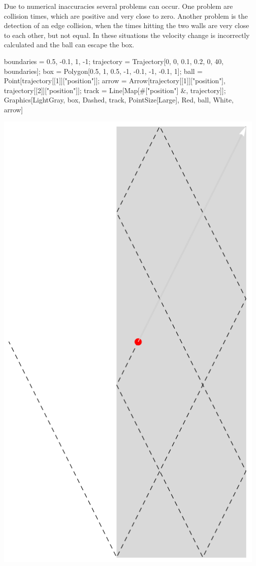 \documentclass{tstextbook}
\begin{document}
\begin{example}
Due to numerical inaccuracies several problems can occur. One problem are collision times, which are positive and very close to zero. Another problem is the detection of an edge collision, when the times hitting the two walls are very close to each other, but not equal. In these situations the velocity change is incorrectly calculated and the ball can escape the box.

\begin{mathematica}
boundaries = {0.5, -0.1, 1, -1};
trajectory = Trajectory[{0, 0}, {0.1, 0.2}, 0, 40, boundaries];
box = Polygon[{{0.5, 1}, {0.5, -1}, {-0.1, -1}, {-0.1, 1}}];
ball = Point[trajectory[[1]]["position"]];
arrow = Arrow[{trajectory[[1]]["position"], 
               trajectory[[2]]["position"]}];
track = Line[Map[#["position"] &, trajectory]];
Graphics[{{LightGray, box}, {Dashed, track}, 
          {PointSize[Large], Red, ball}, 
          {White, arrow}}]
\end{mathematica}

\includegraphics[scale=0.5, center]{images/ball_escapes_box.pdf}


\end{example}
\end{document}
